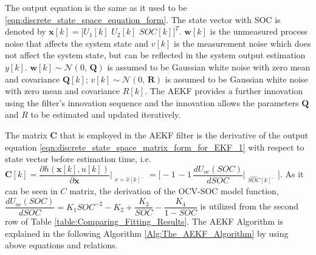 \documentclass[12pt]{article}
\begin{document}
\noindent The output equation is the same as it used to be \ref{eqn:discrete_state_space_equation_form}. The state vector with SOC is denoted by $\bm{x}[k] = \bigg[U_{1}[k]\,\,U_{2}[k]\,\,SOC[k]\bigg]^{T}$. $\bm{w}[k]$ is the unmeasured process noise that
affects the system state and $v[k]$ is the measurement noise which does not affect the system state, but can be reflected in the system
output estimation $y[k]$. $\bm{w}[k] \sim \mathcal{N}(0,\,\bm{Q})$ is assumed to be Gaussian white noise with zero mean and covariance $\bm{Q}[k]$; $v[k] \sim \mathcal{N}(0,\,\bm{R})$ is assumed to be Gaussian white noise with zero mean and covariance $R[k]$. The AEKF provides a further innovation using the filter’s innovation sequence and the innovation allows the parameters $\bm{Q}$ and $R$ to be estimated and updated iteratively. \newline 

\par \noindent The matrix $\bm{C}$ that is employed in the AEKF filter is the derivative of the output equation \ref{eqn:discrete_state_space_matrix_form_for_EKF_1} with respect to state vector before estimation time, i.e. $\bm{C}[k]= \dfrac{\partial h(\bm{x}[k],u[k])}{\partial \bm{x}}\Biggr|_{\substack{x=\hat{x}[k]^{-}}} = \bigg[-1\,-1\,\dfrac{dU_{oc}(SOC)}{dSOC}\Bigr|_{\substack{\hat{SOC}[k]^{-}}}\bigg]$. As it can be seen in $C$ matrix, the derivation of the OCV-SOC model function, $\dfrac{dU_{oc}(SOC)}{dSOC} = K_{1}SOC^{-2}-K_{2}+ \dfrac{K_{3}}{SOC}-\dfrac{K_{4}}{1-SOC}$ is utilized from the second row of Table \ref{table:Comparing_Fitting_Results}. The AEKF Algorithm is explained in the following Algorithm \ref{Alg:The_AEKF_Algorithm} by using above equations and relations. 
\end{document}
